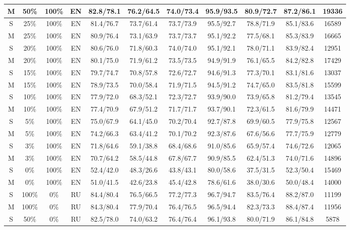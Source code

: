 \begin{table*}
{\begin{tabular}{|c|c|c|c||c|c|c|c|c|c||c|}
M & 50\% & 100\% & EN & 82.8/78.1 & 76.2/64.5 & 74.0/73.4 & 95.9/93.5 & 80.9/72.7 & 87.2/86.1 & 19336 \\ \hline
S & 25\% & 100\% & EN & 81.4/76.7 & 73.7/61.4 & 73.7/73.9 & 95.5/92.7 & 78.8/71.9 & 85.1/83.6 & 16589 \\ \hline
M & 25\% & 100\% & EN & 80.9/76.4 & 73.1/63.9 & 73.7/73.7 & 95.1/92.2 & 77.5/68.1 & 85.3/83.9 & 16665 \\ \hline
S & 20\% & 100\% & EN & 80.6/76.0 & 71.8/60.3 & 74.0/74.0 & 95.1/92.1 & 78.0/71.1 & 83.9/82.4 & 12951 \\ \hline
M & 20\% & 100\% & EN & 80.1/75.0 & 71.9/61.2 & 73.5/73.5 & 94.9/91.9 & 76.1/65.5 & 84.2/82.8 & 17429 \\ \hline
S & 15\% & 100\% & EN & 79.7/74.7 & 70.8/57.8 & 72.6/72.7 & 94.6/91.3 & 77.3/70.1 & 83.1/81.6 & 13037 \\ \hline
M & 15\% & 100\% & EN & 78.9/73.5 & 70.0/58.4 & 71.9/71.5 & 94.5/91.2 & 74.7/65.0 & 83.5/81.8 & 15599 \\ \hline
S & 10\% & 100\% & EN & 77.9/72.0 & 68.3/52.1 & 72.3/72.7 & 93.9/90.0 & 73.9/65.8 & 81.2/79.4 & 13545 \\ \hline
M & 10\% & 100\% & EN & 77.4/70.9 & 67.9/51.2 & 71.7/71.7 & 93.7/90.1 & 72.3/61.5 & 81.6/79.9 & 14471 \\ \hline
S & 5\% & 100\% & EN & 75.0/67.9 & 64.1/45.0 & 70.2/70.4 & 92.7/87.8 & 69.9/60.5 & 77.9/75.8 & 12567 \\ \hline
M & 5\% & 100\% & EN & 74.2/66.3 & 63.4/41.2 & 70.1/70.2 & 92.3/87.6 & 67.6/56.6 & 77.7/75.9 & 12779 \\ \hline
S & 3\% & 100\% & EN & 71.8/64.6 & 59.1/38.8 & 68.4/68.6 & 91.0/85.6 & 65.9/57.4 & 74.6/72.6 & 12065 \\ \hline
M & 3\% & 100\% & EN & 70.7/64.2 & 58.5/44.8 & 67.8/67.7 & 90.9/85.5 & 62.4/51.3 & 74.0/71.6 & 14896 \\ \hline
S & 0\% & 100\% & EN & 52.4/42.0 & 48.3/26.6 & 43.8/43.1 & 80.0/58.6 & 37.5/31.5 & 52.3/50.4 & 15469 \\ \hline
M & 0\% & 100\% & EN & 51.0/41.5 & 42.6/23.8 & 45.4/42.8 & 78.6/61.6 & 38.0/30.6 & 50.0/48.4 & 14000 \\ \hline
S & 100\% & 0\% & RU & 84.4/80.4 & 76.5/66.5 & 77.2/77.3 & 96.7/94.7 & 83.5/76.4 & 88.2/87.0 & 11199 \\ \hline
M & 100\% & 0\% & RU & 84.3/80.4 & 77.9/70.4 & 76.4/76.5 & 96.5/94.4 & 82.3/73.3 & 88.4/87.4 & 11956 \\ \hline
S & 50\% & 0\% & RU & 82.5/78.0 & 74.0/63.2 & 76.4/76.4 & 96.1/93.8 & 80.0/71.9 & 86.1/84.8 & 5878 \\ \hline

\end{tabular}}
\end{table*}
